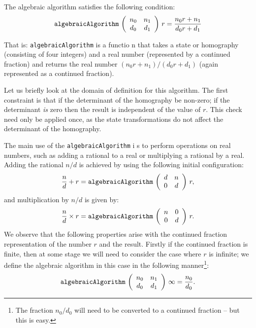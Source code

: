 The algebraic algorithm satisfies the following condition:
\[\mbox{\tt algebraicAlgorithm}\indexTT{algebraicAlgorithm}\,
\left(\begin{array}{cc}n_0&n_1\\d_0&d_1\end{array}\right)\, r =
\frac{n_0r+n_1}{d_0r+d_1}\]

That is: \mbox{\tt algebraicAlgorithm} is a functio
n that takes a state or
homography (consisting of four integers) and a real number
(represented by a continued fraction) and returns the real number
$(n_0r+n_1)/(d_0r+d_1)$ (again represented as a continued fraction).

Let us briefly look at the domain of definition for this
algorithm. The first constraint is that if the determinant of the
homography be non-zero; if the determinant {\em is} zero then the
result is independent of the value of $r$. This check need only be
applied once, as the state transformations do not affect the
determinant of the homography.

The main use of the \mbox{\tt algebraicAlgorithm} i
s to perform operations on
real numbers, such as adding a rational to a real or multiplying a
rational by a real. Adding the rational $n/d$ is achieved by using the
following initial configuration:
\[\frac{n}{d}+r = \mbox{\tt algebraicAlgorithm}\indexTT{algebraicAlgorithm}\,
\left(\begin{array}{cc}d&n\\0&d\end{array}\right)\, r,\]
and multiplication by $n/d$ is given by:
\[\frac{n}{d}\times r = \mbox{\tt algebraicAlgorithm}\indexTT{algebraicAlgorith
m}\,
\left(\begin{array}{cc}n&0\\0&d\end{array}\right)\, r.\]
We observe that the following properties arise with the continued
fraction representation of the number $r$ and the result. Firstly if
the continued fraction is finite, then at some stage we will need to
consider the case where $r$ is infinite; we define the algebraic
algorithm in this case in the following manner\footnote{The fraction
$n_0/d_0$ will need to be converted to a continued fraction -- but this is
easy.}:
\[\mbox{\tt algebraicAlgorithm}\indexTT{algebraicAlgorithm}\,
\left(\begin{array}{cc}n_0&n_1\\d_0&d_1\end{array}\right)\,\infty =
\frac{n_0}{d_0}.\]

